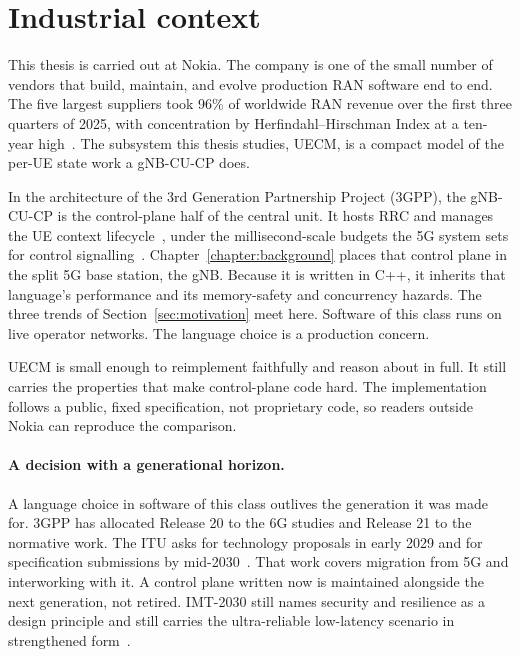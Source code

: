 \documentclass[english,oneside,a4paper,censored,csm,software-track-2020]{HYthesisML}
\begin{document}
\section{Industrial context}\label{sec:industrial}
This thesis is carried out at Nokia. The company is one of the small number of vendors
that build, maintain, and evolve production RAN software end to end. The five largest
suppliers took 96\% of worldwide RAN revenue over the first three quarters of 2025, with
concentration by Herfindahl--Hirschman Index at a ten-year
high~\cite{delloro2025ran3q,delloro2026ran}. The subsystem this thesis studies, UECM, is a compact model of the per-UE state work a
gNB-CU-CP does.

In the architecture of the 3rd Generation Partnership Project (3GPP), the gNB-CU-CP is
the control-plane half of the central unit. It hosts RRC and manages the UE context
lifecycle~\cite{3gpp38401,3gpp38331}, under the millisecond-scale budgets the 5G system
sets for control signalling~\cite{3gpp38913}. Chapter~\ref{chapter:background} places that
control plane in the split 5G base station, the gNB. Because it is written in C++, it inherits that language's
performance and its memory-safety and concurrency hazards. The three trends of
Section~\ref{sec:motivation} meet here. Software of this class runs on live operator
networks. The language choice is a production concern.

UECM is small enough to reimplement faithfully and reason about in full. It still
carries the properties that make control-plane code hard. The implementation follows a
public, fixed specification, not proprietary code, so readers outside Nokia can
reproduce the comparison.

\paragraph{A decision with a generational horizon.}
A language choice in software of this class outlives the generation it was made for.
3GPP has allocated Release 20 to the 6G studies and Release 21 to the normative work.
The ITU asks for technology proposals in early 2029 and for specification submissions by
mid-2030~\cite{3gpp2024road6g}. That work covers migration from 5G and interworking
with it. A control plane written now is maintained alongside the next generation, not
retired. IMT-2030 still names security and resilience as a design principle and still
carries the ultra-reliable low-latency scenario in strengthened
form~\cite{itu2023imt2030}.
\end{document}
